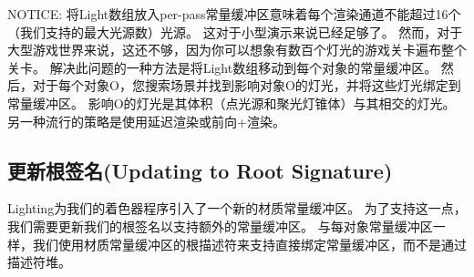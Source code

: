 \begin{flushleft}
NOTICE: 将Light数组放入per-pass常量缓冲区意味着每个渲染通道不能超过16个（我们支持的最大光源数）光源。 这对于小型演示来说已经足够了。 然而，对于大型游戏世界来说，这还不够，因为你可以想象有数百个灯光的游戏关卡遍布整个关卡。 解决此问题的一种方法是将Light数组移动到每个对象的常量缓冲区。 然后，对于每个对象O，您搜索场景并找到影响对象O的灯光，并将这些灯光绑定到常量缓冲区。 影响O的灯光是其体积（点光源和聚光灯锥体）与其相交的灯光。 另一种流行的策略是使用延迟渲染或前向+渲染。\\
\end{flushleft}

\subsection{更新根签名(Updating to Root Signature)}
\begin{flushleft}
Lighting为我们的着色器程序引入了一个新的材质常量缓冲区。 为了支持这一点，我们需要更新我们的根签名以支持额外的常量缓冲区。 与每对象常量缓冲区一样，我们使用材质常量缓冲区的根描述符来支持直接绑定常量缓冲区，而不是通过描述符堆。
\end{flushleft}

